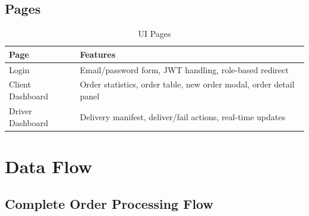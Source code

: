 \documentclass[12pt,a4paper]{article}
\begin{document}
\subsection{Pages}

\begin{table}[H]
\centering
\caption{UI Pages}
\begin{tabularx}{\textwidth}{lX}
\toprule
\textbf{Page} & \textbf{Features} \\
\midrule
Login & Email/password form, JWT handling, role-based redirect \\
Client Dashboard & Order statistics, order table, new order modal, order detail panel \\
Driver Dashboard & Delivery manifest, deliver/fail actions, real-time updates \\
\bottomrule
\end{tabularx}
\end{table}

\section{Data Flow}

\subsection{Complete Order Processing Flow}
\end{document}

